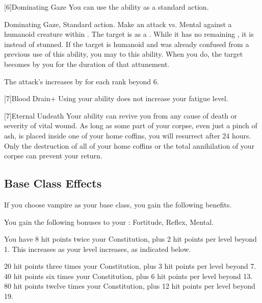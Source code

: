         [6]{Dominating Gaze} You can use the  ability as a standard action.
        \begin{magicalactiveability}{Dominating Gaze}{, }
            \abilityusagetime Standard action.
            \rankline
            Make an attack vs. Mental against a humanoid creature within \shortrange.
            \hit The target is \stunned as a .
            While it has no remaining , it is \confused instead of stunned.
            \crit If the target is humanoid and was already confused from a previous use of this ability, you may  to this ability.
            When you do, the target becomes \dominated by you for the duration of that attunement.

            \rankline
            The attack's  increases by  for each rank beyond 6.
        \end{magicalactiveability}

        [7]{Blood Drain+} Using your  ability does not increase your fatigue level.

        [7]{Eternal Undeath} Your  ability can revive you from any cause of death or severity of vital wound.
        As long as some part of your corpse, even just a pinch of ash, is placed inside one of your home coffins, you will resurrect after 24 hours.
        Only the destruction of all of your home coffins or the total annihilation of your corpse can prevent your return.

    \subsection{Base Class Effects}
        If you choose vampire as your base class, you gain the following benefits.

        You gain the following bonuses to your :  Fortitude,  Reflex,  Mental.

            You have 8 hit points \add twice your Constitution, plus 2 hit points per level beyond 1.
            This increases as your level increases, as indicated below.
            \begin{itemize}
                 20 hit points \add three times your Constitution, plus 3 hit points per level beyond 7.
                 40 hit points \add six times your Constitution, plus 6 hit points per level beyond 13.
                 80 hit points \add twelve times your Constitution, plus 12 hit points per level beyond 19.
            \end{itemize}

